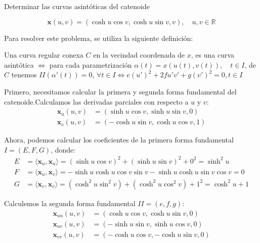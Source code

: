 





\begin{problema}
Determinar las curvas asintóticas del catenoide

$$
\mathbf{x}(u, v)=(\cosh u \cos v, \cosh u \sin v, v), \quad u, v \in \mathbb{R}
$$
\begin{sol}
    Para resolver este problema, se utiliza la siguiente definición: 
    \begin{cajita}
        Una curva regular conexa $C$ en la vecindad coordenada de $x$, es una curva asintótica $\iff$ para cada parametrización $\alpha(t) = x(u(t),v(t)),\quad t\in I$, de $C$ tenemos $II(\alpha'(t))=0$, $\forall t\in I\iff e(u')^2 + 2fu'v' + g(v')^2 = 0, t \in I$
    \end{cajita}
    Primero, necesitamos calcular la primera y segunda forma fundamental del catenoide.Calculamos las derivadas parciales con respecto a $u$ y $v$:
\begin{align*}
    \mathbf{x}_u(u, v) &= (\sinh u \cos v, \sinh u \sin v, 0) \\
    \mathbf{x}_v(u, v) &= (-\cosh u \sin v, \cosh u \cos v, 1)
\end{align*}
    
Ahora, podemos calcular los coeficientes de la primera forma fundamental $I = (E, F, G)$, donde:
\begin{align*}
    E &= \langle \mathbf{x}_u, \mathbf{x}_u \rangle = (\sinh u \cos v)^2 + (\sinh u \sin v)^2 + 0^2 = \sinh^2 u \\
F &= \langle \mathbf{x}_u, \mathbf{x}_v \rangle = -\sinh u \cosh u \cos v\sin v - \sinh u \cosh u \sin v\cos v = 0\\
G &= \langle \mathbf{x}_v, \mathbf{x}_v \rangle = (\cosh^2 u \sin^2 v) + (\cosh^2 u \cos^2 v) + 1^2 = \cosh^2 u + 1
\end{align*}


Calculemos la segunda forma fundamental $II = (e, f, g)$: 
\begin{align*}
    \mathbf{x}_{uu}(u, v) &= (\cosh u \cos v, \cosh u \sin v, 0) \\
\mathbf{x}_{uv}(u, v) &= (-\sinh u \sin v, \sinh u \cos v, 0) \\
\mathbf{x}_{vv}(u, v)& = (-\cosh u \cos v, -\cosh u \sin v, 0)
\end{align*}



\end{sol}
\end{problema}
